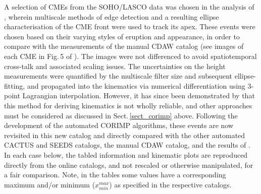 \documentclass[referee,a4paper,12pt,traditabstract]{swsc}
\begin{document}
\begin{linenumbers}
A selection of CMEs from the SOHO/LASCO data was chosen in the analysis of \cite{2009A&A...495..325B}, wherein multiscale methods of edge detection and a resulting ellipse characterisation of the CME front were used to track its apex. These events were chosen based on their varying styles of eruption and appearance, in order to compare with the measurements of the manual CDAW catalog (see images of each CME in Fig.\,5 of \citealt{2009A&A...495..325B}). The images were not differenced to avoid spatiotemporal cross-talk and associated scaling issues. The uncertainties on the height measurements were quantified by the multiscale filter size and subsequent ellipse-fitting, and propagated into the kinematics via numerical differentiation using 3-point Lagrangian interpolation. However, it has since been demonstrated by \cite{2013A&A...557A..96B} that this method for deriving kinematics is not wholly reliable, and other approaches must be considered as discussed in Sect.\,\ref{sect_corimp} above. Following the development of the automated CORIMP algorithms, these events are now revisited in this new catalog and directly compared with the other automated CACTUS and SEEDS catalogs, the manual CDAW catalog, and the results of \cite{2009A&A...495..325B}. In each case below, the tabled information and kinematic plots are reproduced directly from the online catalogs, and not rescaled or otherwise manipulated, for a fair comparison. Note, in the tables some values have a corresponding maximum and/or minimum ($x_{min}^{max}$) as specified in the respective catalogs.




\end{linenumbers}
\end{document}
